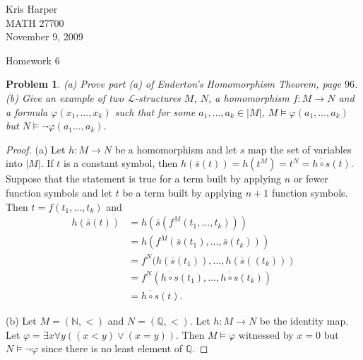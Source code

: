 \documentclass{article}
\newtheorem{problem}{Problem}
\begin{document}
\begin{flushright}
Kris Harper\\

MATH 27700\\

November 9, 2009
\end{flushright}

\begin{center}
Homework 6
\end{center}

\begin{problem}
(a) Prove part (a) of Enderton's Homomorphism Theorem, page $96$.\\
(b) Give an example of two $\mathcal{L}$-structures $M$, $N$, a homomorphism $f : M \to N$ and a formula $\varphi(x_1, \dots , x_k)$ such that for some $a_1, \dots , a_k \in |M|$, $M \models \varphi(a_1, \dots , a_k)$ but $N \models \neg \varphi(a_1 \dots , a_k)$.
\end{problem}
\begin{proof}
(a) Let $h : M \to N$ be a homomorphism and let $s$ map the set of variables into $|M|$. If $t$ is a constant symbol, then $h(\overline{s}(t)) = h(t^M) = t^N = \overline{h \circ s}(t)$. Suppose that the statement is true for a term built by applying $n$ or fewer function symbols and let $t$ be a term built by applying $n+1$ function symbols. Then $t = f(t_1, \dots , t_k)$ and
\begin{align*}
h(\overline{s}(t))
&= h(\overline{s}(f^M(t_1, \dots , t_k)))\\
&= h(f^M(\overline{s}(t_1), \dots , \overline{s}(t_k)))\\
&= f^N(h(\overline{s}(t_1)), \dots , h(\overline{s}((t_k)))\\
&= f^N(\overline{h \circ s}(t_1), \dots , \overline{h \circ s}(t_k))\\
&= \overline{h \circ s}(t).
\end{align*}

(b) Let $M = (\mathbb{N}, <)$ and $N = (\mathbb{Q}, <)$. Let $h : M \to N$ be the identity map. Let $\varphi = \exists x \forall y ((x < y) \vee (x = y))$. Then $M \models \varphi$ witnessed by $x = 0$ but $N \models \neg \varphi$ since there is no least element of $\mathbb{Q}$.
\end{proof}
\end{document}
